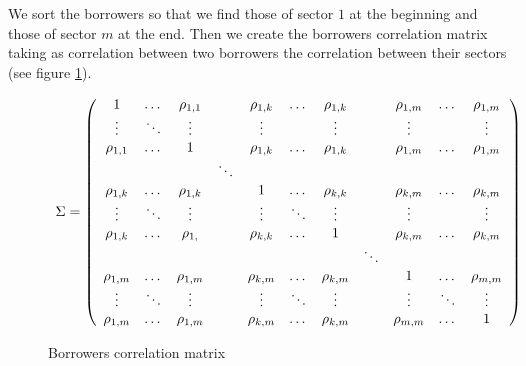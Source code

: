 \documentclass[a4paper,12pt,final]{article}
\begin{document}
We sort the borrowers so that we find those of sector $1$ at the beginning and
those of sector $m$ at the end. Then we create the borrowers correlation matrix 
taking as correlation between two borrowers the correlation between their sectors
(see figure \ref{borrowercorrel}).

\begin{figure}[!hb]
\begin{displaymath}
\begin{array}{c}
\Sigma=
\left(
\begin{array}{ccccccccccc}
1           & \dots    & \rho_{1,1}  &          & \rho_{1,k}  & \dots   & \rho_{1,k}  &         & \rho_{1,m}  & \dots      & \rho_{1,m}  \cr
\vdots      & \ddots   & \vdots      &          & \vdots      &         & \vdots      &         & \vdots      &            & \vdots      \cr
\rho_{1,1}  & \dots    & 1           &          & \rho_{1,k}  & \dots   & \rho_{1,k}  &         & \rho_{1,m}  & \dots      & \rho_{1,m}  \cr

            &          &             & \ddots   &             &         &             &         &             &            &             \cr

\rho_{1,k}  & \dots    & \rho_{1,k}  &          & 1           & \dots   & \rho_{k,k}  &         & \rho_{k,m}  & \dots      & \rho_{k,m}  \cr
\vdots      & \ddots   & \vdots      &          & \vdots      & \ddots  & \vdots      &         & \vdots      &            & \vdots      \cr
\rho_{1,k}  & \dots    & \rho_{1, }  &          & \rho_{k,k}  & \dots   & 1           &         & \rho_{k,m}  & \dots      & \rho_{k,m}  \cr

            &          &             &          &             &         &             & \ddots  &             &            &             \cr

\rho_{1,m}  & \dots    & \rho_{1,m}  &          & \rho_{k,m}  & \dots   & \rho_{k,m}  &         & 1           & \dots      & \rho_{m,m}  \cr
\vdots      & \ddots   & \vdots      &          & \vdots      & \ddots  & \vdots      &         & \vdots      & \ddots     & \vdots      \cr
\rho_{1,m}  & \dots    & \rho_{1,m}  &          & \rho_{k,m}  & \dots   & \rho_{k,m}  &         & \rho_{m,m}  & \dots      & 1           \end{array}
\right)
\end{array}
\end{displaymath}
\caption{Borrowers correlation matrix}
\label{borrowercorrel}
\end{figure}
\end{document}
